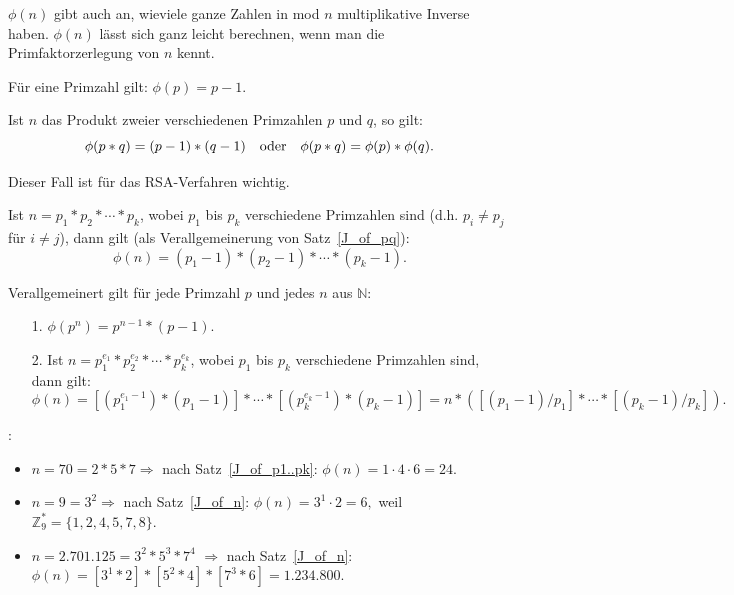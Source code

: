 \begin{refsegment}
$\phi(n)$ gibt auch an, wieviele ganze Zahlen in mod $n$ multiplikative Inverse
haben. $\phi(n)$ lässt sich ganz leicht berechnen, wenn man die Primfaktorzerlegung
 von $n$ kennt.

\begin{satz}\label{thm-zth-phiprime}
Für eine Primzahl gilt: $\phi(p) = p - 1.$
\end{satz}

\begin{satz}\label{thm-zth-phipq} \label{J_of_pq}
Ist $n$ das Produkt zweier verschiedenen Primzahlen $p$ und $q$, so gilt:
$$\phi(p*q) = (p - 1) * (q - 1) \quad {\rm oder} \quad \phi(p * q) = \phi(p) * \phi(q).$$
\end{satz}
Dieser Fall ist für das RSA-Verfahren wichtig.

\begin{satz}\label{thm-zth-phimultprime} \label{J_of_p1..pk}
Ist $n = p_1 * p_2 * \cdots * p_k$, wobei $p_1$ bis $p_k$ verschiedene
Primzahlen sind (d.h. $p_i \not= p_j$ für $i \not= j$), dann gilt (als
Verallgemeinerung von Satz~\ref{J_of_pq}):
$$\phi(n) = (p_1 - 1)*(p_2 - 1)* \cdots *(p_k - 1).$$
\end{satz}


\begin{satz}\label{thm-zth-phinum} \label{J_of_n}

Verallgemeinert gilt für jede Primzahl $p$ und jedes $n$ aus $\mathbb{N}$:
\begin{itemize}
 \item[1.] $\phi(p^n) = p^{n-1} * (p-1)$.
 \item[2.] Ist $n = p_1^{e_1} * p_2^{e_2} * \cdots *p_k^{e_k}$,
           wobei $p_1$ bis $p_k$ verschiedene Primzahlen sind, dann gilt:
           $$\phi(n) = [(p_1^{e_1-1}) * (p_1-1)] * \cdots * [(p_k^{e_k-1})*(p_k - 1)] = n * ([(p_1-1) / p_1] * \cdots * [(p_k-1) / p_k]).$$
\end{itemize}
\end{satz}


\pagebreak  %
\begin{example}{:}
\begin{itemize}
\item  $n=70=2*5*7 \Longrightarrow $ nach Satz~\ref{J_of_p1..pk}: $ \phi(n)= 1\cdot 4 \cdot 6 =24.$
\item  $n=9=3^2 \Longrightarrow$ nach Satz~\ref{J_of_n}: $ \phi(n)= 3^1\cdot 2 =6,$ weil  $\mathbb{Z}_9^* =\{ 1,2,4,5,7,8\}.$
\item $n = 2.701.125 = 3^2 * 5^3 * 7^4$ $\Longrightarrow$ nach Satz~\ref{J_of_n}:
$\phi(n) = [3^1 * 2] * [5^2 * 4] * [7^3 * 6] = 1.234.800.$
\end{itemize}
\end{example}




\end{refsegment}
